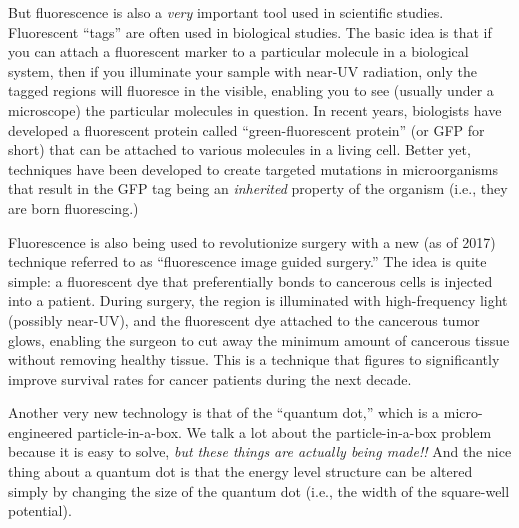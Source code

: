 But fluorescence is also a {\it very} important tool used in scientific
studies.  Fluorescent ``tags'' are often used in biological studies. The
basic idea is that if you can attach a fluorescent marker to a particular
molecule in a biological system, then if you illuminate your sample with
near-UV radiation, only the tagged regions will fluoresce in the visible,
enabling you to see (usually under a microscope) the particular molecules
in question. In recent years, biologists have developed a fluorescent
protein called ``green-fluorescent protein'' (or GFP for short) that can
be attached to various molecules in a living cell. Better yet, techniques
have been developed to create targeted mutations in microorganisms that
result in the GFP tag being an {\it inherited} property of the organism
(i.e., they are born fluorescing.)

Fluorescence is also being used to revolutionize surgery with a new
(as of 2017) technique referred to as ``fluorescence image guided surgery.''
The idea is quite simple: a fluorescent dye that preferentially bonds to
cancerous cells is injected into a patient. During surgery, the region
is illuminated with high-frequency light (possibly near-UV), and the
fluorescent dye attached to the cancerous tumor glows, enabling the
surgeon to cut away the minimum amount of cancerous tissue without
removing healthy tissue. This is a technique that figures to significantly
improve survival rates for cancer patients during the next decade.

Another very new technology is that of the ``quantum dot,'' which
is a micro-engineered particle-in-a-box. We talk a lot about the
particle-in-a-box problem because it is easy to solve, {\it but these
things are actually being made!!} And the nice thing about a quantum dot
is that the energy level structure can be altered simply by changing the
size of the quantum dot (i.e., the width of the square-well potential).

